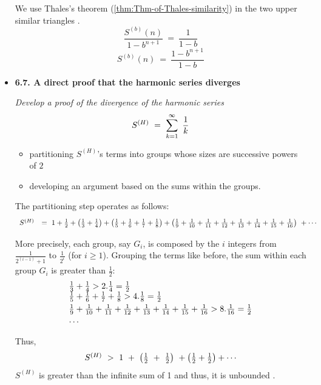 \begin{itemize}
We use Thales's theorem (\ref{thm:Thm-of-Thales-similarity}) in the two upper similar triangles .
\[ \frac{S^{(b)}(n)}{1-b^{n+1}} \ = \ \frac{1}{1-b} \]
\[ S^{(b)}(n) \ = \ \frac{1-b^{n+1}}{1-b} \]

\medskip

\item
{\bf 6.7. A direct proof that the harmonic series diverges}

{\em Develop a proof of the divergence of the harmonic series 
\[ S^{(H)} \ = \ \sum_{k=1}^\infty \ {1 \over k} \]
\begin{itemize}
\item
partitioning $S^{(H)}$'s terms into groups whose sizes are successive powers of $2$
\item
developing an argument based on the sums within the groups.
\end{itemize}
}

\smallskip

The partitioning step operates as follows:
{\footnotesize
\[ 
\begin{array}{ll}
S^{(H)}   & = \ 1  + {1 \over 2} + \left(  {1 \over 3}   +  {1 \over 4}  \right) + \left( {1 \over 5} + {1 \over 6}+ {1 \over 7}  +  {1 \over 8} \right) + \left( {1 \over 9} + {1 \over 10}+ {1 \over 11}  +{1 \over 12} + {1 \over 13} + {1 \over 14} + {1 \over 15} + {1 \over 16} \right) \ +\cdots
\end{array} \]
}

More precisely, each group, say $G_i$, is composed by the $i$ integers from $\frac{1}{2^{(i-1)}+1}$ to $\frac{1}{2^{i}}$ 
(for $i \geq 1$).
Grouping the terms like before, the sum within each group $G_i$ is greater than $\frac{1}{2}$:
\[ 
\begin{array}{l}
{1 \over 3} + {1 \over 4}  > 2.{1 \over 4} = {1 \over 2} \\ \smallskip
{1 \over 5} + {1 \over 6} + {1 \over 7}+ {1 \over 8}  > 4.{1 \over 8} = {1 \over 2}  \\  \smallskip
{1 \over 9} + {1 \over 10} + {1 \over 11}  +{1 \over 12} + {1 \over 13} + {1 \over 14} + {1 \over 15} + {1 \over 16}  > 8.{1 \over 16} = {1 \over 2}  \\  \smallskip
\cdots
\end{array} \]
Thus, 
\[ 
\begin{array}{ll}
S^{(H)} \ > \ 1 \ + \ \left( {1 \over 2} \ + \ {1 \over 2} \right) \ + \left( {1 \over 2} + {1 \over 2} \right) + \cdots
\end{array} \]
$S^{(H)}$ is greater than the infinite sum of 1 and thus, it is unbounded .


\end{itemize}
